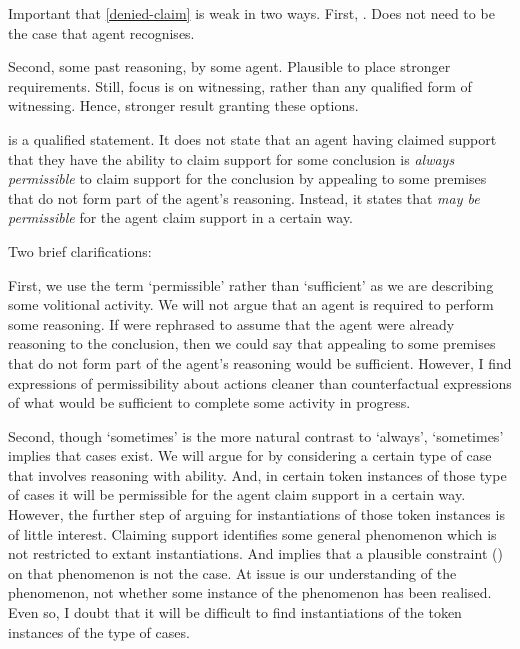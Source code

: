 \begin{note}
  Important that \autoref{denied-claim} is weak in two ways.
  First, .
  Does not need to be the case that agent recognises.

  Second, some past reasoning, by some agent.
  Plausible to place stronger requirements.
  Still, focus is on witnessing, rather than any qualified form of witnessing.
  Hence, stronger result granting these options.
\end{note}

\begin{note}
  \EAS{} is a qualified statement.
  It does not state that an agent having claimed support that they have the ability to claim support for some conclusion is \emph{always permissible} to claim support for the conclusion by appealing to some premises that do not form part of the agent's reasoning.
  Instead, it states that \emph{may be permissible} for the agent claim support in a certain way.

  Two brief clarifications:
\end{note}

\begin{note}
  First, we use the term `permissible' rather than `sufficient' as we are describing some volitional activity.
  We will not argue that an agent is required to perform some reasoning.
  If \EAS{} were rephrased to assume that the agent were already reasoning to the conclusion, then we could say that appealing to some premises that do not form part of the agent's reasoning would be sufficient.
  However, I find expressions of permissibility about actions cleaner than counterfactual expressions of what would be sufficient to complete some activity in progress.
\end{note}

\begin{note}
  Second, though `sometimes' is the more natural contrast to `always', `sometimes' implies that cases exist.
  We will argue for \EAS{} by considering a certain type of case that involves reasoning with ability.
  And, in certain token instances of those type of cases it will be permissible for the agent claim support in a certain way.
  However, the further step of arguing for instantiations of those token instances is of little interest.
  Claiming support identifies some general phenomenon which is not restricted to extant instantiations.
  And \EAS{} implies that a plausible constraint (\ESU{}) on that phenomenon is not the case.
  At issue is our understanding of the phenomenon, not whether some instance of the phenomenon has been realised.
  Even so, I doubt that it will be difficult to find instantiations of the token instances of the type of cases.
\end{note}

